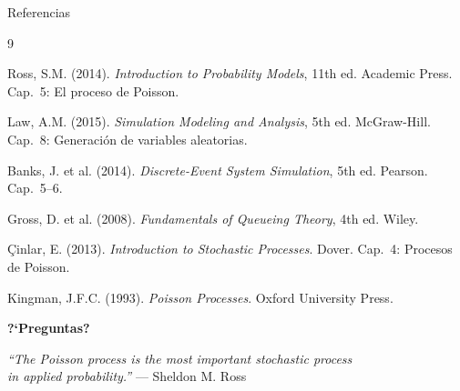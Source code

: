 \documentclass[aspectratio=1610, 9pt]{beamer}
\begin{document}
\begin{frame}{Referencias}

\begin{thebibliography}{9}
\small

 Ross, S.M. (2014). \textit{Introduction to Probability Models}, 11th ed. Academic Press. Cap.~5: El proceso de Poisson.

 Law, A.M. (2015). \textit{Simulation Modeling and Analysis}, 5th ed. McGraw-Hill. Cap.~8: Generaci\'{o}n de variables aleatorias.

 Banks, J. et al. (2014). \textit{Discrete-Event System Simulation}, 5th ed. Pearson. Cap.~5--6.

 Gross, D. et al. (2008). \textit{Fundamentals of Queueing Theory}, 4th ed. Wiley.

 \c{C}inlar, E. (2013). \textit{Introduction to Stochastic Processes}. Dover. Cap.~4: Procesos de Poisson.

 Kingman, J.F.C. (1993). \textit{Poisson Processes}. Oxford University Press.

\end{thebibliography}
\end{frame}

\begin{frame}{}

\begin{center}
\vspace{1cm}
{\Huge\textbf{?`Preguntas?}}


\vspace{0.5cm}
{\large\textit{``The Poisson process is the most important stochastic process\\in applied probability.''} --- Sheldon M. Ross}


\end{center}
\end{frame}
\end{document}
